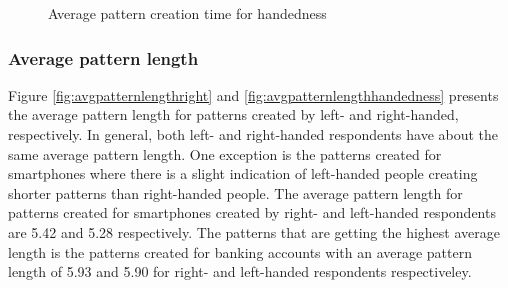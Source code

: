       \begin{figure}[H]
        \centering
        \caption{Average pattern creation time for handedness}
        \label{fig:avgcreationtimehandedness}
      \end{figure}

    \subsubsection{Average pattern length}
    Figure \ref{fig:avgpatternlengthright} and \ref{fig:avgpatternlengthhandedness} presents the average pattern length for patterns created by left- and right-handed, respectively. In general, both left- and right-handed respondents have about the same average pattern length. One exception is the patterns created for smartphones where there is a slight indication of left-handed people creating shorter patterns than right-handed people. The average pattern length for patterns created for smartphones created by right- and left-handed respondents are 5.42 and 5.28 respectively. The patterns that are getting the highest average length is the patterns created for banking accounts with an average pattern length of 5.93 and 5.90 for right- and left-handed respondents respectiveley. 

